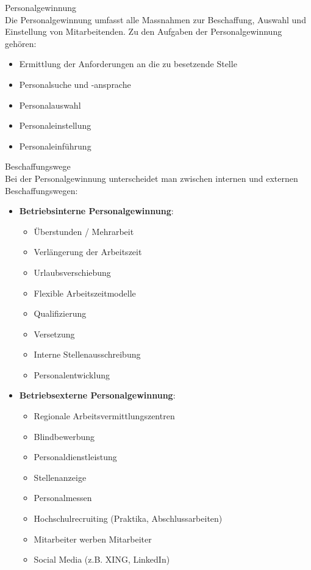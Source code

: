 \begin{definition}{Personalgewinnung}\\
Die Personalgewinnung umfasst alle Massnahmen zur Beschaffung, Auswahl und Einstellung von Mitarbeitenden. Zu den Aufgaben der Personalgewinnung gehören:
\begin{itemize}
    \item Ermittlung der Anforderungen an die zu besetzende Stelle
    \item Personalsuche und -ansprache
    \item Personalauswahl
    \item Personaleinstellung
    \item Personaleinführung
\end{itemize}
\end{definition}

\begin{definition}{Beschaffungswege}\\
Bei der Personalgewinnung unterscheidet man zwischen internen und externen Beschaffungswegen:
\begin{itemize}
    \item \textbf{Betriebsinterne Personalgewinnung}:
    \begin{itemize}
        \item Überstunden / Mehrarbeit
        \item Verlängerung der Arbeitszeit
        \item Urlaubsverschiebung
        \item Flexible Arbeitszeitmodelle
        \item Qualifizierung
        \item Versetzung
        \item Interne Stellenausschreibung
        \item Personalentwicklung
    \end{itemize}
    \item \textbf{Betriebsexterne Personalgewinnung}:
    \begin{itemize}
        \item Regionale Arbeitsvermittlungszentren
        \item Blindbewerbung
        \item Personaldienstleistung
        \item Stellenanzeige
        \item Personalmessen
        \item Hochschulrecruiting (Praktika, Abschlussarbeiten)
        \item Mitarbeiter werben Mitarbeiter
        \item Social Media (z.B. XING, LinkedIn)
    \end{itemize}
\end{itemize}
\end{definition}

